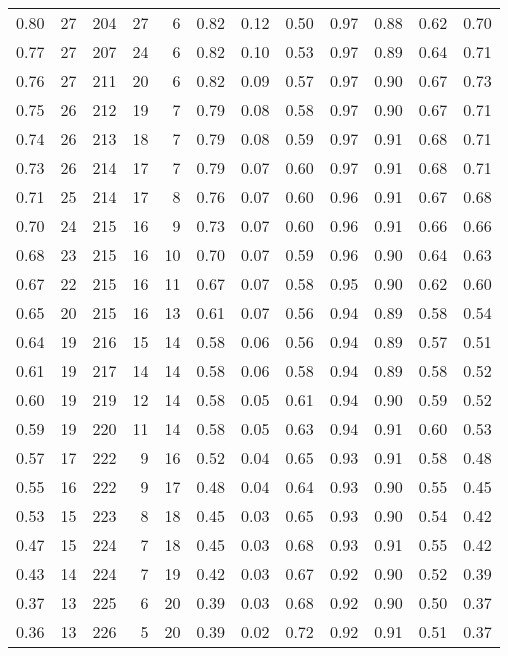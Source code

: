 \begin{table}[ht]
\begin{tabular}{r|rrrrrrrrrrr}
  0.80 & 27 & 204 & 27 & 6 & 0.82 & 0.12 & 0.50 & 0.97 & 0.88 & 0.62 & 0.70 \\ 
  0.77 & 27 & 207 & 24 & 6 & 0.82 & 0.10 & 0.53 & 0.97 & 0.89 & 0.64 & 0.71 \\ 
  0.76 & 27 & 211 & 20 & 6 & 0.82 & 0.09 & 0.57 & 0.97 & 0.90 & 0.67 & 0.73 \\ 
  0.75 & 26 & 212 & 19 & 7 & 0.79 & 0.08 & 0.58 & 0.97 & 0.90 & 0.67 & 0.71 \\ 
  0.74 & 26 & 213 & 18 & 7 & 0.79 & 0.08 & 0.59 & 0.97 & 0.91 & 0.68 & 0.71 \\ 
  0.73 & 26 & 214 & 17 & 7 & 0.79 & 0.07 & 0.60 & 0.97 & 0.91 & 0.68 & 0.71 \\ 
  0.71 & 25 & 214 & 17 & 8 & 0.76 & 0.07 & 0.60 & 0.96 & 0.91 & 0.67 & 0.68 \\ 
  0.70 & 24 & 215 & 16 & 9 & 0.73 & 0.07 & 0.60 & 0.96 & 0.91 & 0.66 & 0.66 \\ 
  0.68 & 23 & 215 & 16 & 10 & 0.70 & 0.07 & 0.59 & 0.96 & 0.90 & 0.64 & 0.63 \\ 
  0.67 & 22 & 215 & 16 & 11 & 0.67 & 0.07 & 0.58 & 0.95 & 0.90 & 0.62 & 0.60 \\ 
  0.65 & 20 & 215 & 16 & 13 & 0.61 & 0.07 & 0.56 & 0.94 & 0.89 & 0.58 & 0.54 \\ 
  0.64 & 19 & 216 & 15 & 14 & 0.58 & 0.06 & 0.56 & 0.94 & 0.89 & 0.57 & 0.51 \\ 
  0.61 & 19 & 217 & 14 & 14 & 0.58 & 0.06 & 0.58 & 0.94 & 0.89 & 0.58 & 0.52 \\ 
  0.60 & 19 & 219 & 12 & 14 & 0.58 & 0.05 & 0.61 & 0.94 & 0.90 & 0.59 & 0.52 \\ 
  0.59 & 19 & 220 & 11 & 14 & 0.58 & 0.05 & 0.63 & 0.94 & 0.91 & 0.60 & 0.53 \\ 
  0.57 & 17 & 222 & 9 & 16 & 0.52 & 0.04 & 0.65 & 0.93 & 0.91 & 0.58 & 0.48 \\ 
  0.55 & 16 & 222 & 9 & 17 & 0.48 & 0.04 & 0.64 & 0.93 & 0.90 & 0.55 & 0.45 \\ 
  0.53 & 15 & 223 & 8 & 18 & 0.45 & 0.03 & 0.65 & 0.93 & 0.90 & 0.54 & 0.42 \\ 
  0.47 & 15 & 224 & 7 & 18 & 0.45 & 0.03 & 0.68 & 0.93 & 0.91 & 0.55 & 0.42 \\ 
  0.43 & 14 & 224 & 7 & 19 & 0.42 & 0.03 & 0.67 & 0.92 & 0.90 & 0.52 & 0.39 \\ 
  0.37 & 13 & 225 & 6 & 20 & 0.39 & 0.03 & 0.68 & 0.92 & 0.90 & 0.50 & 0.37 \\ 
  0.36 & 13 & 226 & 5 & 20 & 0.39 & 0.02 & 0.72 & 0.92 & 0.91 & 0.51 & 0.37 \\ 

\end{tabular}
\end{table}
